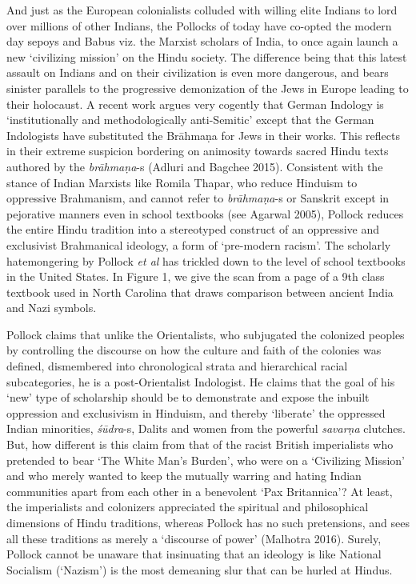 And just as the European colonialists colluded with willing elite Indians to lord over millions of other Indians, the Pollocks of today have co-opted the modern day sepoys and Babus viz. the Marxist scholars of India, to once again launch a new ‘civilizing mission’ on the Hindu society. The difference being that this latest assault on Indians and on their civilization is even more dangerous, and bears sinister parallels to the progressive demonization of the Jews in Europe leading to their holocaust. A recent work argues very cogently that German Indology is ‘institutionally and methodologically anti-Semitic’ except that the German Indologists have substituted the Brāhmaṇa for Jews in their works. This reflects in their extreme suspicion bordering on animosity towards sacred Hindu texts authored by the \textit{brāhmaṇa}-s (Adluri and Bagchee 2015). Consistent with the stance of Indian Marxists like Romila Thapar, who reduce Hinduism to oppressive Brahmanism, and cannot refer to \textit{brāhmaṇa}-s or Sanskrit except in pejorative manners even in school textbooks (see Agarwal 2005), Pollock reduces the entire Hindu tradition into a stereotyped construct of an oppressive and exclusivist Brahmanical ideology, a form of ‘pre-modern racism’. The scholarly hatemongering by Pollock \textit{et al} has trickled down to the level of school textbooks in the United States. In Figure 1, we give the scan from a page of a 9th class textbook used in North Carolina that draws comparison between ancient India and Nazi symbols.

Pollock claims that unlike the Orientalists, who subjugated the colonized peoples by controlling the discourse on how the culture and faith of the colonies was defined, dismembered into chronological strata and hierarchical racial subcategories, he is a post-Orientalist Indologist. He claims that the goal of his ‘new’ type of scholarship should be to demonstrate and expose the inbuilt oppression and exclusivism in Hinduism, and thereby ‘liberate’ the oppressed Indian minorities, \textit{śūdra}-s, Dalits and women from the powerful \textit{savarṇa} clutches. But, how different is this claim from that of the racist British imperialists who pretended to bear ‘The White Man’s Burden’, who were on a ‘Civilizing Mission’ and who merely wanted to keep the mutually warring and hating Indian communities apart from each other in a benevolent ‘Pax Britannica’? At least, the imperialists and colonizers appreciated the spiritual and philosophical dimensions of Hindu traditions, whereas Pollock has no such pretensions, and sees all these traditions as merely a ‘discourse of power’ (Malhotra 2016). Surely, Pollock cannot be unaware that insinuating that an ideology is like National Socialism (‘Nazism’) is the most demeaning slur that can be hurled at Hindus.

